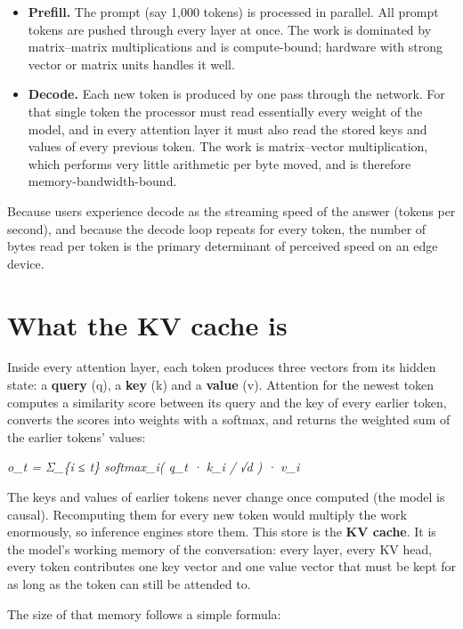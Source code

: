 \documentclass[12pt,a4paper]{report}
\begin{document}
\begin{itemize}
\item \textbf{Prefill.} The prompt (say 1,000 tokens) is processed in parallel. All prompt tokens are pushed through every layer at once. The work is dominated by matrix–matrix multiplications and is compute-bound; hardware with strong vector or matrix units handles it well.
\item \textbf{Decode.} Each new token is produced by one pass through the network. For that single token the processor must read essentially every weight of the model, and in every attention layer it must also read the stored keys and values of every previous token. The work is matrix–vector multiplication, which performs very little arithmetic per byte moved, and is therefore memory-bandwidth-bound.
\end{itemize}
Because users experience decode as the streaming speed of the answer (tokens per second), and because the decode loop repeats for every token, the number of bytes read per token is the primary determinant of perceived speed on an edge device.

\section{What the KV cache is}\label{sec:1_3}
Inside every attention layer, each token produces three vectors from its hidden state: a \textbf{query} (q), a \textbf{key} (k) and a \textbf{value} (v). Attention for the newest token computes a similarity score between its query and the key of every earlier token, converts the scores into weights with a softmax, and returns the weighted sum of the earlier tokens' values:

\begin{center}\small\textit{o\_\allowbreak{}t = Σ\_\allowbreak{}\{i ≤ t\} softmax\_\allowbreak{}i( q\_\allowbreak{}t · k\_\allowbreak{}i / √d ) · v\_\allowbreak{}i}\end{center}
The keys and values of earlier tokens never change once computed (the model is causal). Recomputing them for every new token would multiply the work enormously, so inference engines store them. This store is the \textbf{KV cache}. It is the model's working memory of the conversation: every layer, every KV head, every token contributes one key vector and one value vector that must be kept for as long as the token can still be attended to.

The size of that memory follows a simple formula:
\end{document}
